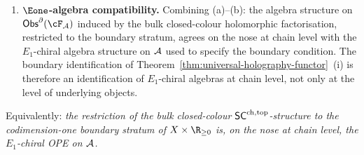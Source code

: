 \begin{theorem}
\begin{enumerate}[label=\textup{(\alph*)}]
\begin{equation}
\end{equation}
for all $a, b \in \bar\cA$, where the right-hand side is the
$\Delta_*$-extension of the chiral product on the boundary algebra.
\item \textbf{$\Eone$-algebra compatibility.} Combining (a)--(b):
the algebra structure on $\Obs^\partial(\cF_\cA)$ induced by the
bulk closed-colour holomorphic factorisation, restricted to the
boundary stratum, agrees on the nose at chain level with the
$E_1$-chiral algebra structure on $\mathcal{A}$ used to specify the
boundary condition. The boundary identification of
Theorem~\ref{thm:universal-holography-functor}~(i) is therefore an
identification of $E_1$-chiral algebras at chain level, not only at
the level of underlying objects.
\end{enumerate}
Equivalently: \emph{the restriction of the bulk closed-colour
$\mathsf{SC}^{\mathrm{ch},\mathrm{top}}$-structure to the codimension-one boundary stratum of
$X \times \R_{\geq 0}$ is, on the nose at chain level, the
$E_1$-chiral OPE on $\mathcal{A}$.}
\end{theorem}

